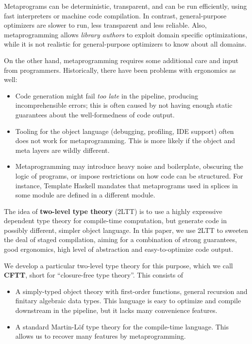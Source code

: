 \documentclass[acmsmall,screen,review,anonymous]{acmart}
\begin{document}
Metaprograms can be deterministic, transparent, and can be run efficiently,
using fast interpreters or machine code compilation. In contrast,
general-purpose optimizers are slower to run, less transparent and less
reliable. Also, metaprogramming allows \emph{library authors} to exploit domain
specific optimizations, while it is not realistic for general-purpose optimizers
to know about all domains.

On the other hand, metaprogramming requires some additional care and input from
programmers. Historically, there have been problems with ergonomics as well:
\begin{itemize}
\item Code generation might fail \emph{too late} in the pipeline, producing
      incomprehensible errors; this is often caused by not having enough static
      guarantees about the well-formedness of code output.
\item Tooling for the object language (debugging, profiling, IDE support) often does not
      work for metaprogramming. This is more likely if the object and meta layers are wildly
      different.
\item Metaprogramming may introduce heavy noise and boilerplate, obscuring the logic of
      programs, or impose restrictions on how code can be structured. For instance,
      Template Haskell mandates that metaprograms used in splices in some module are
      defined in a different module.
\end{itemize}

The idea of \textbf{two-level type theory} (2LTT) is to use a highly expressive
dependent type theory for compile-time computation, but generate code in
possibly different, simpler object language. In this paper, we use 2LTT to sweeten the
deal of staged compilation, aiming for a combination of strong guarantees, good
ergonomics, high level of abstraction and easy-to-optimize code output.

We develop a particular two-level type theory for this purpose, which we
call \textbf{CFTT}, short for ``closure-free type theory''. This consists
of
\begin{itemize}
\item A simply-typed object theory with first-order functions, general recursion and
      finitary algebraic data types. This language is easy to optimize and compile
      downstream in the pipeline, but it lacks many convenience features.
\item A standard Martin-Löf type theory for the compile-time language. This
      allows us to recover many features by metaprogramming.
\end{itemize}
\end{document}
